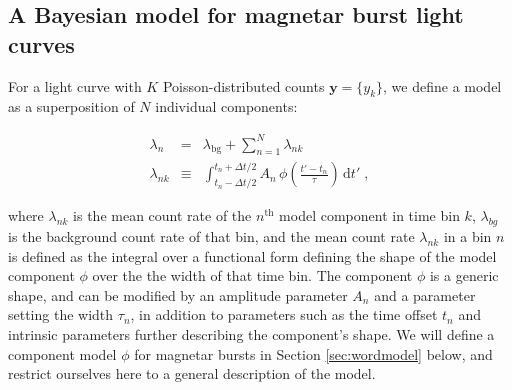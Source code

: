 \documentclass[12pt]{emulateapj}
\newcommand{\given}{\,|\,}
\newcommand{\dd}{\mathrm{d}}
\newcommand{\counts}{y}
\newcommand{\pars}{\theta}
\newcommand{\mean}{\lambda}
\newcommand{\Poisson}{{\mathcal P}}
\newcommand{\bg}{\mathrm{bg}}
\newcommand{\word}{\phi}
\begin{document}
\subsection{A Bayesian model for magnetar burst light curves}
\label{sec:model}

For a light curve with $K$ Poisson-distributed counts $\bm{\counts} = \{\counts_k\}$, we define a model as a superposition of $N$ individual components:

\begin{eqnarray}
\mean_n &=& \mean_{\bg} + \sum_{n=1}^N \mean_{nk}
\\
\mean_{nk} &\equiv& \int_{t_n-\Delta t/2}^{t_n+\Delta t/2} A_n\,\word(\frac{t'-t_n}{\tau})\,\dd t' \; ,
\end{eqnarray}

where $\mean_{nk}$ is the mean count rate of the $n^{\mathrm{th}}$ model component in time bin $k$, 
$\mean_{bg}$ is the background count rate of that bin,
and the mean count rate $\mean_{nk}$ in a bin $n$ is defined as the integral over a functional form defining the shape of
the model component $\word$ over the the width of that time bin. The component $\word$ is a generic shape,
and can be modified by an amplitude parameter $A_n$ and a parameter setting the width $\tau_n$, in addition to
parameters such as the time offset $t_n$ and intrinsic parameters further describing the component's shape.
We will define a component model $\word$ for magnetar bursts in Section \ref{sec:wordmodel} below, and
restrict ourselves here to a general description of the model.
 
  
\end{document}
